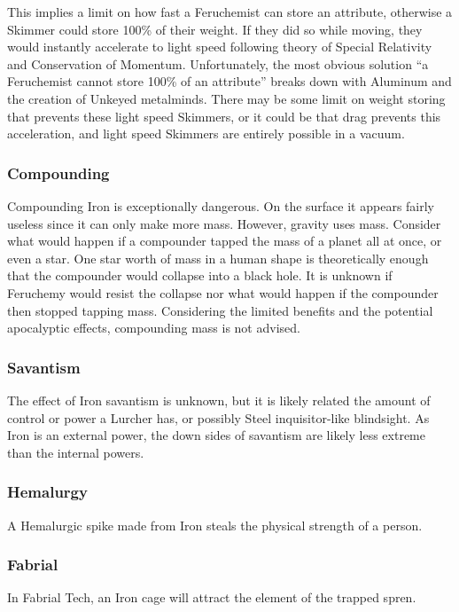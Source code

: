 \documentclass[conference]{IEEEtran}
\newcommand{\n}{\hfill\break}
\begin{document}
This implies a limit on how fast a Feruchemist can store an attribute, otherwise a Skimmer could store 100\% of their weight.  If they did so while moving, they would instantly accelerate to light speed\cite{Massless} following theory of Special Relativity\cite{spec-rel} and Conservation of Momentum.  Unfortunately, the most obvious solution ``a Feruchemist cannot store 100\% of an attribute'' breaks down with Aluminum and the creation of Unkeyed metalminds.  There may be some limit on weight storing that prevents these light speed Skimmers, or it could be that drag prevents this acceleration, and light speed Skimmers are entirely possible in a vacuum.
\subsubsection*{\textbf{Compounding}}
Compounding Iron is exceptionally dangerous.  On the surface it appears fairly useless since it can only make more mass.  However, gravity uses mass.  Consider what would happen if a compounder tapped the mass of a planet all at once, or even a star.  One star worth of mass\cite{solar-mass} in a human shape is theoretically enough that the compounder would collapse into a black hole.\cite{swartz}  It is unknown if Feruchemy would resist the collapse nor what would happen if the compounder then stopped tapping mass.
Considering the limited benefits and the potential apocalyptic effects, compounding mass is not advised. \\
\subsubsection*{\textbf{Savantism}}
The effect of Iron savantism is unknown, but it is likely related the amount of control or power a Lurcher has, or possibly Steel inquisitor-like blindsight.\cite{TFE-CH36}  As Iron is an external power, the down sides of savantism are likely less extreme than the internal powers.\\
\subsubsection*{\textbf{Hemalurgy}}
A Hemalurgic spike made from Iron steals the physical strength of a person.\cite{HE-TB}\\  
\subsubsection*{\textbf{Fabrial}}
In Fabrial Tech, an Iron cage will attract the element of the trapped spren.\cite{RoW-E11}\cite{WoR-CH82}\n
\end{document}

